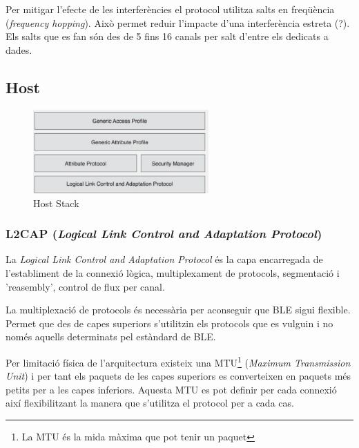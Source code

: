 Per mitigar l'efecte de les interferències el protocol utilitza salts en freqüència (\textit{frequency hopping}).
Això permet reduir l'impacte d'una interferència estreta (?).
Els salts que es fan són des de 5 fins 16 canals per salt d'entre els dedicats a dades.


\subsection{Host}
\begin{figure}[h!]
	\begin{center}
		\includegraphics[width=0.6\textwidth]{./images/host.png}
		\caption{Host Stack}
\end{center}
\end{figure}

\subsubsection{L2CAP (\textit{Logical Link Control and Adaptation Protocol})}
La \textit{Logical Link Control and Adaptation Protocol} és la capa encarregada de l'establiment de la connexió lògica, multiplexament de protocols, segmentació i 'reasembly', control de flux per canal.

La multiplexació de protocols és necessària per aconseguir que BLE sigui flexible.
Permet que des de capes superiors s'utilitzin els protocols que es vulguin i no només aquells determinats pel estàndard de BLE.

Per limitació física de l'arquitectura existeix una MTU\footnote{La MTU és la mida màxima que pot tenir un paquet} (\textit{Maximum Transmission Unit}) i per tant els paquets de les capes superiors es converteixen en paquets més petits per a les capes inferiors.
Aquesta MTU es pot definir per cada connexió així flexibilitzant la manera que s'utilitza el protocol per a cada cas.

